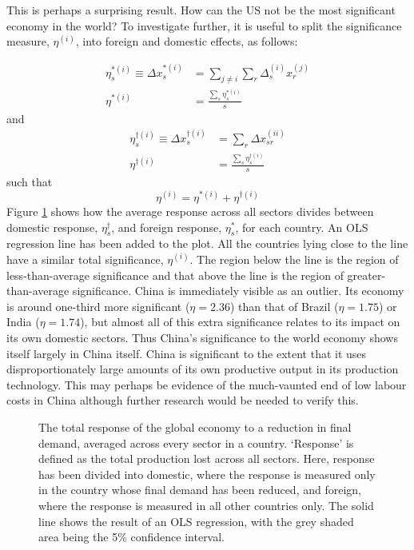 \documentclass[a4paper]{article}
\begin{document}
This is perhaps a surprising result.
How can the US not be the most significant economy in the world?
To investigate further, it is useful to split the significance measure, $\eta^{(i)}$, into foreign and domestic effects, as follows:

\begin{align}
\eta_s^{*(i)} \equiv \Delta x_{s}^{*(i)} & = 
	\sum_{j \neq i} \sum_r \Delta_{s}^{(i)} x_{r}^{(j)} \\
\eta^{*(i)} & = 
	\frac{\sum_s \eta_s^{*(i)}}{s}
\end{align}
and
\begin{align}
\eta_s^{\dagger(i)} \equiv \Delta x_{s}^{\dagger(i)} & = 
	\sum_r \Delta x_{sr}^{(ii)} \\
\eta^{\dagger(i)} & = 
	\frac{\sum_s \eta_s^{\dagger(i)}}{s}
\end{align}
such that
\begin{equation}
\eta^{(i)} = \eta^{*(i)} + \eta^{\dagger(i)}
\end{equation}
Figure \ref{fig:countries_domestic_vs_foreign} shows how the average response across all sectors divides between domestic response, $\eta_s^{\dagger}$, and foreign response, $\eta_s^{*}$, for each country. 
An OLS regression line has been added to the plot.
All the countries lying close to the line have a similar total significance, $\eta^{(i)}$.
The region below the line is the region of less-than-average significance and that above the line is the region of greater-than-average significance.
China is immediately visible as an outlier.
Its economy is around one-third more significant ($\eta = 2.36$) than that of Brazil ($\eta = 1.75$) or India ($\eta = 1.74$), but almost all of this extra significance relates to its impact on its own domestic sectors.
Thus China's significance to the world economy shows itself largely in China itself. China is significant to the extent that it uses disproportionately large amounts of its own productive output in its production technology.
This may perhaps be evidence of the much-vaunted end of low labour costs in China  \parencite{li_end_2012, the_economist_end_2012} although further research would be needed to verify this.

\begin{figure}
\centering
\caption{The total response of the global economy to a reduction in final demand, averaged across every sector in a country. 
`Response' is defined as the total production lost across all sectors.
Here, response has been divided into domestic, where the response is measured only in the country whose final demand has been reduced, and foreign, where the response is measured in all other countries only.
The solid line shows the result of an OLS regression, with the grey shaded area being the 5\% confidence interval.}
\label{fig:countries_domestic_vs_foreign}
\end{figure}
\end{document}
